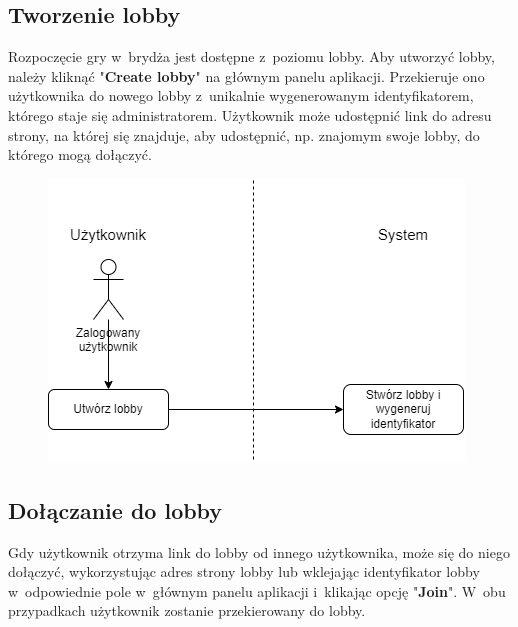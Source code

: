 \FloatBarrier

\subsection{Tworzenie lobby}

Rozpoczęcie gry w~brydża jest dostępne z~poziomu lobby. Aby utworzyć
lobby, należy kliknąć "\textbf{Create lobby}" na głównym panelu
aplikacji. Przekieruje ono użytkownika do nowego lobby
z~unikalnie wygenerowanym identyfikatorem, którego staje
się administratorem. Użytkownik może udostępnić link do adresu strony,
na której się znajduje, aby udostępnić, np. znajomym swoje lobby, do
którego mogą dołączyć.


\begin{figure}[h]
  \centering
  \includegraphics[width=\textwidth]{img/schematy/create_lobby.png}
  \caption{}
\end{figure}

\FloatBarrier

\subsection{Dołączanie do lobby}

Gdy użytkownik otrzyma link do lobby od innego użytkownika, może się
do niego dołączyć, wykorzystując adres strony lobby lub wklejając
identyfikator lobby w~odpowiednie pole w~głównym panelu aplikacji
i~klikając opcję "\textbf{Join}". W~obu przypadkach użytkownik zostanie
przekierowany do lobby.

